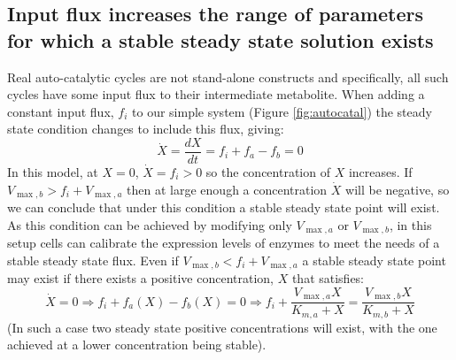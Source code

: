 \documentclass[a4page,notitlepage]{article}
\begin{document}
    \subsection{Input flux increases the range of parameters for which a stable steady state solution exists}
    Real auto-catalytic cycles are not stand-alone constructs and specifically, all such cycles have some input flux to their intermediate metabolite.
    When adding a constant input flux, $f_i$ to our simple system (Figure \ref{fig:autocatal}) the steady state condition changes to include this flux, giving:
    \begin{equation*}
      \dot X = \frac{dX}{dt} = f_i + f_a - f_b = 0
    \end{equation*}
    In this model, at $X=0$, $\dot X=f_i>0$ so the concentration of $X$ increases. 
    If $V_{\max,b}>f_i+V_{\max,a}$ then at large enough a concentration $\dot X$ will be negative, so we can conclude that under this condition a stable steady state point will exist.
    As this condition can be achieved by modifying only $V_{\max,a}$ or $V_{\max,b}$, in this setup cells can calibrate the expression levels of enzymes to meet the needs of a stable steady state flux.
    Even if $V_{\max,b}<f_i+V_{\max,a}$ a stable steady state point may exist if there exists a positive concentration, $X$ that satisfies:
    \begin{equation*}
        \dot X = 0 \Rightarrow f_i + f_a(X) - f_b(X) = 0 \Rightarrow f_i+\frac{V_{\max,a}X}{K_{m,a}+X} = \frac{V_{\max,b}X}{K_{m,b}+X} 
    \end{equation*}
    (In such a case two steady state positive concentrations will exist, with the one achieved at a lower concentration being stable).
\end{document}
